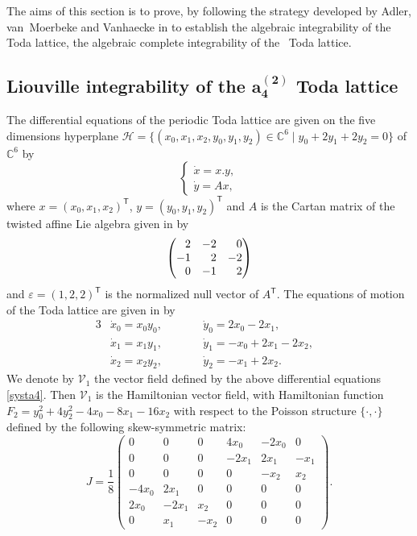 \documentclass[pdftex]{sigma}
\numberwithin{equation}{section}
\begin{document}
The aims of this section is to prove, by following the strategy
developed by Adler, van~Moerbeke and Vanhaecke in \cite[Section~9.4]{al_Moer3} to establish the algebraic integrability of
the  Toda lattice, the algebraic complete
integrability of the~ Toda lattice.

\subsection[Liouville integrability of the a\_4\^{}(2) Toda lattice]{Liouville integrability of the $\boldsymbol{a_4^{(2)}}$ Toda lattice}

The differential equations of the periodic 
Toda lattice
 are given on the five dimensions hyperplane
 $\mathcal{H} =\big\{( x_0, x_1, x_2, y_0, y_1, y_2 )\in
\mathbb{C}^6 \mid y_0 + 2 y_1 + 2y_2 = 0 \big\}$ of $\mathbb{C}^6$ by
\[
 \begin{cases}
 \dot{x}=x.y,\\
 \dot{y}=Ax,
 \end{cases}\]
where $x=(x_0,x_1,x_2)^{\mathsf{T}}$,
$y=(y_0,y_1,y_2)^{\mathsf{T}}$ and $A$ is the Cartan matrix
of the twisted affine Lie algebra  given in
\cite{al_Moer3} by
\[
 \begin{pmatrix}
 \hphantom{-} 2 & -2 & \hphantom{-}0 \\
 -1 & \hphantom{-}2 & -2 \\
 \hphantom{-}0 & -1 & \hphantom{-}2 \\
 \end{pmatrix}
\]
and $\varepsilon=(1,2,2)^{\mathsf{T}}$ is the
normalized null vector of $A^{\mathsf{T}}$.
 The equations of motion of the  Toda lattice are given
 in \cite{al_Moer3} by
\begin{alignat}{3}
& \dot{x}_0=x_0y_0, \qquad && \dot{y}_0=2x_0-2x_1, & \nonumber\\
& \dot{x}_1=x_1y_1, \qquad && \dot{y}_1=-x_0+2x_1-2x_2, &\nonumber\\
& \dot{x}_2=x_2y_2, \qquad && \dot{y}_2=-x_1 + 2x_2. & \label{systa4}
\end{alignat}
We denote by $\mathcal{V}_1$ the vector field defined by the above
differential equations \eqref{systa4}. Then $\mathcal{V}_1$ is the
Hamiltonian vector field, with Hamiltonian function $ F_2=y_0^2
+ 4y_2^2-4x_0-8x_1-16x_2 $ with respect to the Poisson
structure $\{\cdot,\cdot\}$ defined by the following
skew-symmetric matrix:
\begin{equation}\label{matrij2}
 J=\frac{1}{8}\begin{pmatrix}
 0 & 0 & 0 & 4x_0 & -2x_0 & 0 \\
 0 & 0 & 0 & -2x_1 & 2x_1 & -x_1 \\
 0 & 0 & 0 & 0 & -x_2 & x_2 \\
 -4x_0 & 2x_1 & 0 & 0 & 0 & 0 \\
 2x_0 & -2x_1 & x_2 & 0 & 0 & 0 \\
 0 & x_1 & -x_2 & 0 & 0 & 0
 \end{pmatrix}.
\end{equation}
\end{document}
